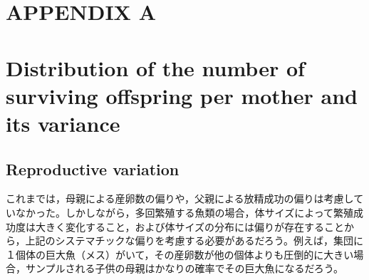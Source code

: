 \documentclass[AMA,STIX1COL]{WileyNJD-v2}
\begin{document}
\clearpage

\section*{APPENDIX A}
\setcounter{equation}{0}

\section*{Distribution of the number of surviving offspring per mother and its variance}

\renewcommand{\theequation}{A\arabic{equation}}


\subsection{Reproductive variation}

これまでは，母親による産卵数の偏りや，父親による放精成功の偏りは考慮していなかった。しかしながら，多回繁殖する魚類の場合，体サイズによって繁殖成功度は大きく変化すること，および体サイズの分布には偏りが存在することから，上記のシステマチックな偏りを考慮する必要があるだろう。例えば，集団に１個体の巨大魚（メス）がいて，その産卵数が他の個体よりも圧倒的に大きい場合，サンプルされる子供の母親はかなりの確率でその巨大魚になるだろう。
\end{document}

